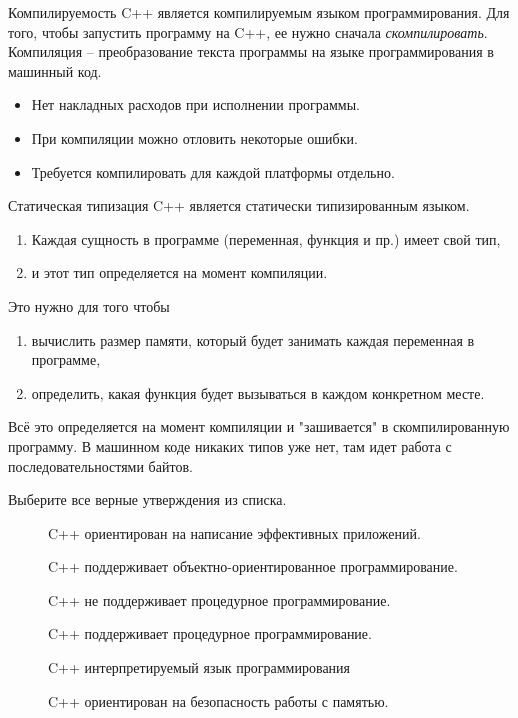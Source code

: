 \documentclass[
    9pt,
    hyperref={pdfencoding=unicode}
    ]{beamer}
\begin{document}
\begin{frame}{Компилируемость}
    C++ является компилируемым языком программирования.
    Для того, чтобы запустить программу на C++, ее нужно сначала
    \emph{скомпилировать}.
    Компиляция – преобразование текста программы на языке
    программирования в машинный код.
    \begin{itemize}
        \item Нет накладных расходов при исполнении программы.
        \item При компиляции можно отловить некоторые ошибки.
        \item Требуется компилировать для каждой платформы отдельно.
    \end{itemize}
\end{frame}
\begin{frame}{Статическая типизация}
    C++ является статически типизированным языком.
    \begin{enumerate}
        \item Каждая сущность в программе (переменная, функция и пр.)
        имеет свой тип,
        \item и этот тип определяется на момент компиляции.
    \end{enumerate}
    Это нужно для того чтобы
    \begin{enumerate}
        \item  вычислить размер памяти, который будет занимать каждая
        переменная в программе,
        \item  определить, какая функция будет вызываться в каждом
        конкретном месте.
    \end{enumerate}
    Всё это определяется на момент компиляции и "зашивается" в
    скомпилированную программу. В машинном коде никаких типов
    уже нет, там идет работа с последовательностями байтов.
\end{frame}
\begin{frame}
    Выберите все верные утверждения из списка.
    \begin{description}
        \item[\Square]  C++ ориентирован на написание эффективных
        приложений.
        \item[\Square]  C++ поддерживает объектно-ориентированное
        программирование.
        \item[\Square]  C++ не поддерживает процедурное
        программирование.
        \item[\Square]  C++ поддерживает процедурное
        программирование.
        \item[\Square]  C++ интерпретируемый язык программирования
        \item[\Square]  C++ ориентирован на безопасность работы с памятью.
    \end{description}
\end{frame}
\end{document}
